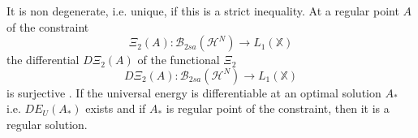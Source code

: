 \documentclass[aps,preprint]{revtex4}%
\begin{document}
It is non degenerate, i.e. unique, if this is a strict inequality. At a
regular point $A$ of the constraint
\begin{equation}
\Xi_{2}\left(  A\right)  :\mathcal{B}_{2sa}\left(  \mathcal{H}^{N}\right)
\rightarrow L_{1}\left(  \mathbb{X}\right)
\end{equation}
the differential $D\Xi_{2}\left(  A\right)  $ of the functional $\Xi_{2}$
\begin{equation}
D\Xi_{2}\left(  A\right)  :\mathcal{B}_{2sa}\left(  \mathcal{H}^{N}\right)
\rightarrow L_{1}\left(  \mathbb{X}\right)
\end{equation}
is surjective \cite{weiner2005}. If the universal energy is differentiable at
an optimal solution $A_{\ast}$ i.e. $DE_{U}\left(  A_{\ast}\right)  $ exists
and if $A_{\ast}$ is regular point of the constraint, then it is a regular solution.
\end{document}
